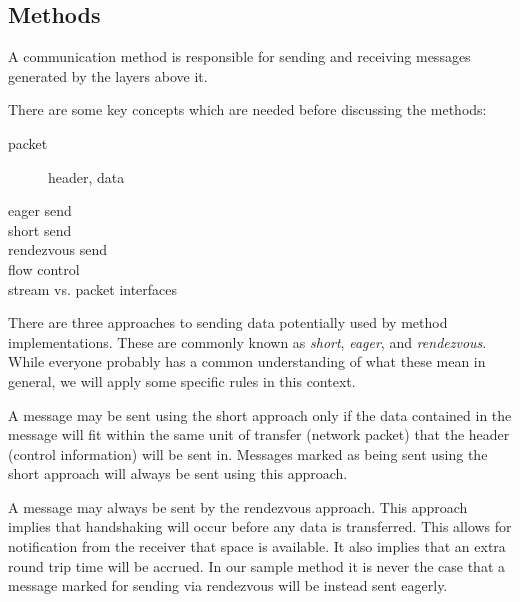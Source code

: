 \documentclass[11pt,letterpaper]{article}
\begin{document}

\subsection{Methods}

A communication method is responsible for sending and receiving
messages generated by the layers above it.



There are some key concepts which are needed before discussing the methods:
\begin{description}
\item[packet] header, data
\item[eager send]
\item[short send]
\item[rendezvous send]
\item[flow control]
\item[stream vs. packet interfaces]
\end{description}

There are three approaches to sending data potentially used by method
implementations.  These are commonly known as \emph{short}, \emph{eager}, and
\emph{rendezvous}.  While everyone probably has a common understanding of what
these mean in general, we will apply some specific rules in this context.

A message may be sent using the short approach only if the data contained in
the message will fit within the same unit of transfer (network packet) that the
header (control information) will be sent in.  Messages marked as being sent
using the short approach will always be sent using this approach.

A message may always be sent by the rendezvous approach.  This approach implies
that handshaking will occur before any data is transferred.  This allows for
notification from the receiver that space is available.  It also implies that
an extra round trip time will be accrued.  In our sample method it is never the
case that a message marked for sending via rendezvous will be instead sent
eagerly.
\end{document}

